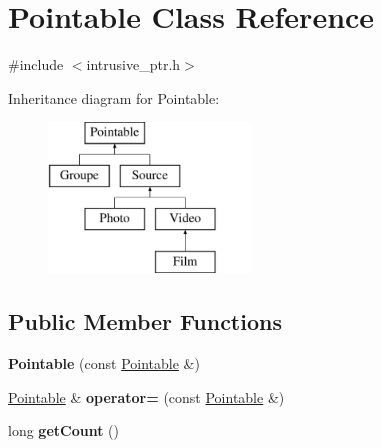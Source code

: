 \hypertarget{classPointable}{\section{Pointable Class Reference}
\label{classPointable}
}


{\ttfamily \#include $<$intrusive\-\_\-ptr.\-h$>$}

Inheritance diagram for Pointable\-:\begin{figure}[H]
\begin{center}
\leavevmode
\includegraphics[height=4.000000cm]{classPointable}
\end{center}
\end{figure}
\subsection*{Public Member Functions}
\begin{DoxyCompactItemize}
\item 
\hypertarget{classPointable_adc4da364054bdd4c4a9624f5dc190c8a}{{\bfseries Pointable} (const \hyperlink{classPointable}{Pointable} \&)}\label{classPointable_adc4da364054bdd4c4a9624f5dc190c8a}

\item 
\hypertarget{classPointable_a8a7eb6956905e6e320ce97fa24f03b59}{\hyperlink{classPointable}{Pointable} \& {\bfseries operator=} (const \hyperlink{classPointable}{Pointable} \&)}\label{classPointable_a8a7eb6956905e6e320ce97fa24f03b59}

\item 
\hypertarget{classPointable_a48c9c705dd509cdafc2663b092865120}{long {\bfseries get\-Count} ()}\label{classPointable_a48c9c705dd509cdafc2663b092865120}

\end{DoxyCompactItemize}
